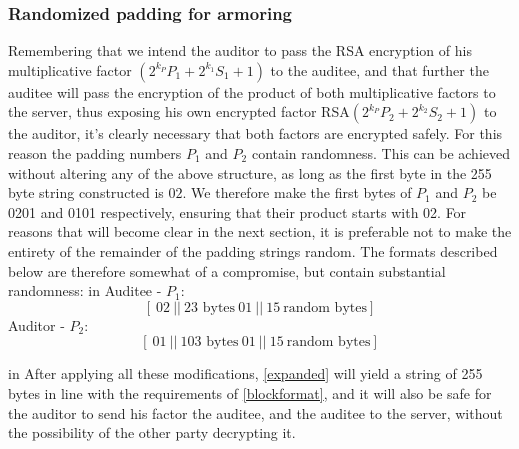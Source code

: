 \documentclass[10pt,a4paper]{article}
\begin{document}
\subsubsection{Randomized padding for armoring}
\noindent Remembering that we intend the auditor to pass the RSA encryption of his multiplicative factor $(2^{k_P}P_1+2^{k_1}S_1+1)$ to the auditee, and that further the auditee will pass the encryption of the product of both multiplicative factors to the server, thus exposing his own encrypted factor RSA$(2^{k_P}P_2+2^{k_2}S_2+1)$ to the auditor, it's clearly necessary that both factors are encrypted safely. For this reason the padding numbers $P_1$ and $P_2$ contain randomness. This can be achieved without altering any of the above structure, as long as the first byte in the 255 byte string constructed is $02$. We therefore make the first bytes of $P_1$ and $P_2$ be 0201 and 0101 respectively, ensuring that their product starts with 02. For reasons that will become clear in the next section, it is preferable not to make the entirety of the remainder of the padding strings random. The formats described below are therefore somewhat of a compromise, but contain substantial randomness:
 in 
\noindent Auditee - $P_1$:
\begin{equation}\label{auditee_padding}
[ \ 02\ ||\ \textrm{23 bytes}\ 01\ ||\ 15\ \textrm{random bytes} ] 
\end{equation}
\noindent Auditor - $P_2$:
\begin{equation}\label{auditor_padding}
[\ 01\ ||\ \textrm{103 bytes}\ 01\ ||\ 15\ \textrm{random bytes} ] 
\end{equation}

 in 
\noindent After applying all these modifications, \eqref{expanded} will yield a string of 255 bytes in line with the requirements of \eqref{blockformat}, and it will also be safe for the auditor to send his factor the auditee, and the auditee to the server, without the possibility of the other party decrypting it.
\end{document}
